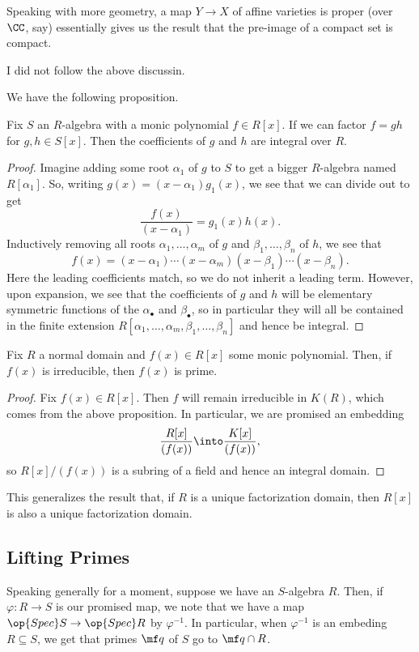 Speaking with more geometry, a map $Y\to X$ of affine varieties is proper (over $\CC$, say) essentially gives us the result that the pre-image of a compact set is compact.
\begin{remark}
	I did not follow the above discussin.
\end{remark}
We have the following proposition.
\begin{proposition}
	Fix $S$ an $R$-algebra with a monic polynomial $f\in R[x]$. If we can factor $f=gh$ for $g,h\in S[x]$. Then the coefficients of $g$ and $h$ are integral over $R$.
\end{proposition}
\begin{proof}
	Imagine adding some root $\alpha_1$ of $g$ to $S$ to get a bigger $R$-algebra named $R[\alpha_1]$. So, writing $g(x)=(x-\alpha_1)g_1(x)$, we see that we can divide out to get
	\[\frac{f(x)}{(x-\alpha_1)}=g_1(x)h(x).\]
	Inductively removing all roots $\alpha_1,\ldots,\alpha_m$ of $g$ and $\beta_1,\ldots,\beta_n$ of $h$, we see that
	\[f(x)=(x-\alpha_1)\cdots(x-\alpha_m)(x-\beta_1)\cdots(x-\beta_n).\]
	Here the leading coefficients match, so we do not inherit a leading term. However, upon expansion, we see that the coefficients of $g$ and $h$ will be elementary symmetric functions of the $\alpha_\bullet$ and $\beta_\bullet$, so in particular they will all be contained in the finite extension $R[\alpha_1,\ldots,\alpha_m,\beta_1,\ldots,\beta_n]$ and hence be integral.
\end{proof}
\begin{corollary}
	Fix $R$ a normal domain and $f(x)\in R[x]$ some monic polynomial. Then, if $f(x)$ is irreducible, then $f(x)$ is prime.
\end{corollary}
\begin{proof}
	Fix $f(x)\in R[x]$. Then $f$ will remain irreducible in $K(R)$, which comes from the above proposition. In particular, we are promised an embedding
	\[\frac{R[x]}{(f(x))}\into\frac{K[x]}{(f(x))},\]
	so $R[x]/(f(x))$ is a subring of a field and hence an integral domain.
\end{proof}
\begin{remark}
	This generalizes the result that, if $R$ is a unique factorization domain, then $R[x]$ is also a unique factorization domain.
\end{remark}

\subsection{Lifting Primes}
Speaking generally for a moment, suppose we have an $S$-algebra $R$. Then, if $\varphi:R\to S$ is our promised map, we note that we have a map $\op{Spec}S\to\op{Spec}R$ by $\varphi^{-1}$. In particular, when $\varphi^{-1}$ is an embeding $R\subseteq S$, we get that primes $\mf q$ of $S$ go to $\mf q\cap R$.

